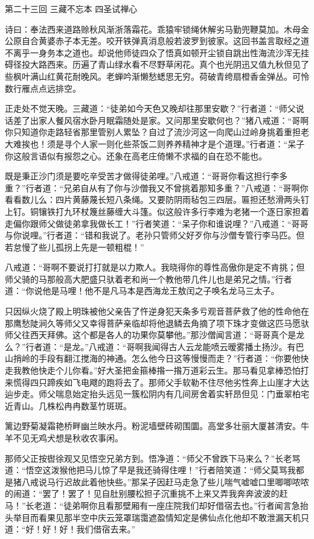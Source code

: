 \documentclass[12pt,UTF8]{ctexbook}
\begin{document}
{第二十三回 三藏不忘本 四圣试禅心

诗曰：奉法西来道路赊秋风渐浙落霜花。乖猿牢锁绳休解劣马勤兜鞭莫加。木母金公原自合黄婆赤子本无差。咬开铁弹真消息般若波罗到彼家。这回书盖言取经之道不离乎一身务本之道也。却说他师徒四众了悟真如顿开尘锁自跳出性海流沙浑无挂碍径投大路西来。历遍了青山绿水看不尽野草闲花。真个也光阴迅又值九秋但见了些枫叶满山红黄花耐晚风。老蝉吟渐懒愁蟋思无穷。荷破青绔扇橙香金弹丛。可怜数行雁点点远排空。

正走处不觉天晚。三藏道：“徒弟如今天色又晚却往那里安歇？”行者道：“师父说话差了出家人餐风宿水卧月眠霜随处是家。又问那里安歇何也？”猪八戒道：“哥啊你只知道你走路轻省那里管别人累坠？自过了流沙河这一向爬山过岭身挑着重担老大难挨也！须是寻个人家一则化些茶饭二则养养精神才是个道理。”行者道：“呆子你这般言语似有报怨之心。还象在高老庄倚懒不求福的自在恐不能也。

既是秉正沙门须是要吃辛受苦才做得徒弟哩。”八戒道：“哥哥你看这担行李多重？”行者道：“兄弟自从有了你与沙僧我又不曾挑着那知多重？”八戒道：“哥啊你看看数儿么：四片黄藤蔑长短八条绳。又要防阴雨毡包三四层。匾担还愁滑两头钉上钉。铜镶铁打九环杖篾丝藤缠大斗篷。似这般许多行李难为老猪一个逐日家担着走偏你跟师父做徒弟拿我做长工！”行者笑道：“呆子你和谁说哩？”八戒道：“哥哥与你说哩。”行者道：“错和我说了。老孙只管师父好歹你与沙僧专管行李马匹。但若怠慢了些儿孤拐上先是一顿粗棍！”

八戒道：“哥啊不要说打打就是以力欺人。我晓得你的尊性高傲你是定不肯挑；但师父骑的马那般高大肥盛只驮着老和尚一个教他带几件儿也是弟兄之情。”行者道：“你说他是马哩！他不是凡马本是西海龙王敖闰之子唤名龙马三太子。

只因纵火烧了殿上明珠被他父亲告了忤逆身犯天条多亏观音菩萨救了他的性命他在那鹰愁陡涧久等师父又幸得菩萨亲临却将他退鳞去角摘了项下珠才变做这匹马愿驮师父往西天拜佛。这个都是各人的功果你莫攀他。”那沙僧闻言道：“哥哥真个是龙么？”行者道：“是龙。”八戒道：“哥啊我闻得古人云龙能喷云暧雾播土扬沙。有巴山捎岭的手段有翻江搅海的神通。怎么他今日这等慢慢而走？”行者道：“你要他快走我教他快走个儿你看。”好大圣把金箍棒揝一揝万道彩云生。那马看见拿棒恐怕打来慌得四只蹄疾如飞电飕的跑将去了。那师父手软勒不住尽他劣性奔上山崖才大达辿步走。师父喘息始定抬头远见一簇松阴内有几间房舍着实轩昂但见：门垂翠柏宅近青山。几株松冉冉数茎竹斑斑。

篱边野菊凝霜艳桥畔幽兰映水丹。粉泥墙壁砖砌围圜。高堂多壮丽大厦甚清安。牛羊不见无鸡犬想是秋收农事闲。

那师父正按辔徐观又见悟空兄弟方到。悟净道：“师父不曾跌下马来么？”长老骂道：“悟空这泼猴他把马儿惊了早是我还骑得住哩！”行者陪笑道：“师父莫骂我都是猪八戒说马行迟故此着他快些。”那呆子因赶马走急了些儿喘气嘘嘘口里唧唧哝哝的闹道：“罢了！罢了！见自肚别腰松担子沉重挑不上来又弄我奔奔波波的赶马！”长老道：“徒弟啊你且看那壁厢有一座庄院我们却好借宿去也。”行者闻言急抬头举目而看果见那半空中庆云笼罩瑞霭遮盈情知定是佛仙点化他却不敢泄漏天机只道：“好！好！好！我们借宿去来。”

}
\end{document}
